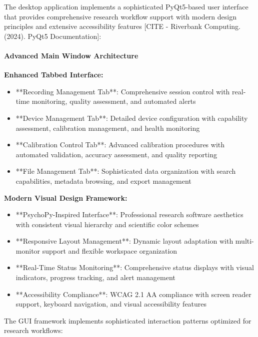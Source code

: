 \documentclass[12pt,a4paper]{article}
\begin{document}
The desktop application implements a sophisticated PyQt5-based user interface that provides comprehensive research
workflow support with modern design principles and extensive accessibility
features [CITE - Riverbank Computing. (2024). PyQt5 Documentation]:

\paragraph{Advanced Main Window Architecture}

\textbf{Enhanced Tabbed Interface:}

\begin{itemize}
\item **Recording Management Tab**: Comprehensive session control with real-time monitoring, quality assessment, and
  automated alerts
\item **Device Management Tab**: Detailed device configuration with capability assessment, calibration management, and
  health monitoring
\item **Calibration Control Tab**: Advanced calibration procedures with automated validation, accuracy assessment, and
  quality reporting
\item **File Management Tab**: Sophisticated data organization with search capabilities, metadata browsing, and export
  management

\end{itemize}
\textbf{Modern Visual Design Framework:}

\begin{itemize}
\item **PsychoPy-Inspired Interface**: Professional research software aesthetics with consistent visual hierarchy and
  scientific color schemes
\item **Responsive Layout Management**: Dynamic layout adaptation with multi-monitor support and flexible workspace
  organization
\item **Real-Time Status Monitoring**: Comprehensive status displays with visual indicators, progress tracking, and alert
  management
\item **Accessibility Compliance**: WCAG 2.1 AA compliance with screen reader support, keyboard navigation, and visual
  accessibility features

\end{itemize}
The GUI framework implements sophisticated interaction patterns optimized for research workflows:
\end{document}
